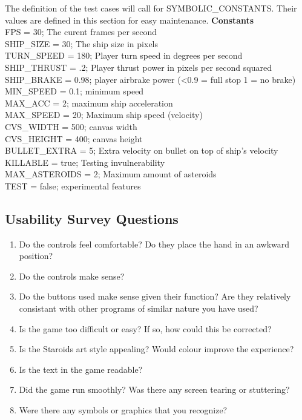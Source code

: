 \documentclass[12pt, titlepage]{article}
\begin{document}
The definition of the test cases will call for SYMBOLIC\_CONSTANTS.
Their values are defined in this section for easy maintenance.
\textbf{Constants}\\
FPS = 30; The curent frames per second\\
SHIP\_SIZE = 30; The ship size in pixels\\
TURN\_SPEED = 180; Player turn speed in degrees per second\\
SHIP\_THRUST = .2; Player thrust power in pixels per second squared \\
SHIP\_BRAKE = 0.98; player airbrake power (<0.9 = full stop 1 = no brake) \\
MIN\_SPEED = 0.1; minimum speed \\
MAX\_ACC = 2; maximum ship acceleration \\
MAX\_SPEED = 20; Maximum ship speed (velocity) \\
CVS\_WIDTH = 500; canvas width \\
CVS\_HEIGHT = 400; canvas height \\
BULLET\_EXTRA = 5; Extra velocity on bullet on top of ship's velocity \\
KILLABLE = true; Testing invulnerability \\
MAX\_ASTEROIDS = 2; Maximum amount of asteroids \\
TEST = false; experimental features \\


\subsection{Usability Survey Questions}
\label{interview:questions}

\begin{enumerate}

  \item Do the controls feel comfortable? Do they place the hand in an awkward position?
  \item Do the controls make sense?
  \item Do the buttons used make sense given their function? Are they relatively consistant with other programs of similar nature you have used?
  \item Is the game too difficult or easy? If so, how could this be corrected?
  \item Is the Staroids art style appealing? Would colour improve the experience?
  \item Is the text in the game readable?
  \item Did the game run smoothly? Was there any screen tearing or stuttering?
  \item Were there any symbols or graphics that you recognize?

\end{enumerate}
\end{document}
